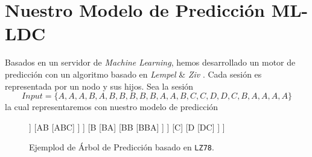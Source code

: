 


\section{Nuestro Modelo de Predicción ML-LDC}\label{sec:nuestromodelopredict-mlldc}






Basados en un servidor de \emph{Machine Learning}, hemos desarrollado un motor de predicción con un algoritmo basado en \emph{Lempel} \& \emph{Ziv} \cite{ZivLempel1977}. Cada sesión es representada por un nodo y sus hijos. Sea la sesión \begin{equation}
Input = \{ A,A,A,B,A,B,B,B,B,B,A,A,B,C,C,D,D,C,B,A,A,A,A \}
\end{equation} la cual representaremos con nuestro modelo de predicción



\begin{figure}[h] 
	\centering
	\begin{forest} 
	[ $\epsilon$
		[A
			[AA
				[AAA]	
			]
			[AB
				[ABC]
			]
		]
		[B
			[BA]
			[BB
				[BBA]
			]
		]
		[C]
		[D
			[DC]
		]
	]
	\end{forest}
	\caption{Ejemplod de Árbol de Predicción basado en \texttt{LZ78}.}
	\label{fig:lztrie1}
\end{figure}

